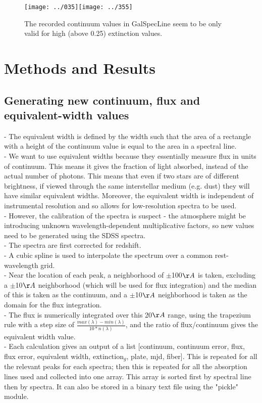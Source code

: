 \documentclass[manuscript]{aastex}
\begin{document}
\begin{figure}
\texttt{[image: ../035]}\texttt{[image: ../355]}\\
\caption{The recorded continuum values in GalSpecLine seem to be only valid for high (above 0.25) extinction values.}
\end{figure}

\section{Methods and Results}
\subsection{Generating new continuum, flux and equivalent-width values}
- The equivalent width is defined by the width such that the area of a rectangle with a height of the continuum value is equal to the area in a spectral line.\\
- We want to use equivalent widths because they essentially measure flux in units of continuum. This means it gives the fraction of light absorbed, instead of the actual number of photons. This means that even if two stars are of different brightness, if viewed through the same interstellar medium (e.g. dust) they will have similar equivalent widths. Moreover, the equivalent width is independent of instrumental resolution and so allows for low-resolution spectra to be used.\\
- However, the calibration of the spectra is suspect - the atmosphere might be introducing unknown wavelength-dependent multiplicative factors, so new values need to be generated using the SDSS spectra.\\
- The spectra are first corrected for redshift.\\
- A cubic spline is used to interpolate the spectrum over a common rest-wavelength grid.\\
- Near the location of each peak, a neighborhood of $\pm$100$\AA$ is taken, excluding a $\pm$10$\AA$ neighborhood (which will be used for flux integration) and the median of this is taken as the continuum, and a $\pm$10$\AA$ neighborhood is taken as the domain for the flux integration.\\
- The flux is numerically integrated over this 20$\AA$ range, using the trapezium rule with a step size of  $\frac{max(\lambda)-min(\lambda)}{10*n(\lambda)}$, and the ratio of flux/continuum gives the equivalent width value.\\
- Each calculation gives an output of a list [continuum, continuum error, flux, flux error, equivalent width, extinction$_g$, plate, mjd, fiber]. This is repeated for all the relevant peaks for each spectra; then this is repeated for all the absorption lines used and collected into one array. This array is sorted first by spectral line then by spectra. It can also be stored in a binary text file using the "pickle" module. \\
\end{document}
